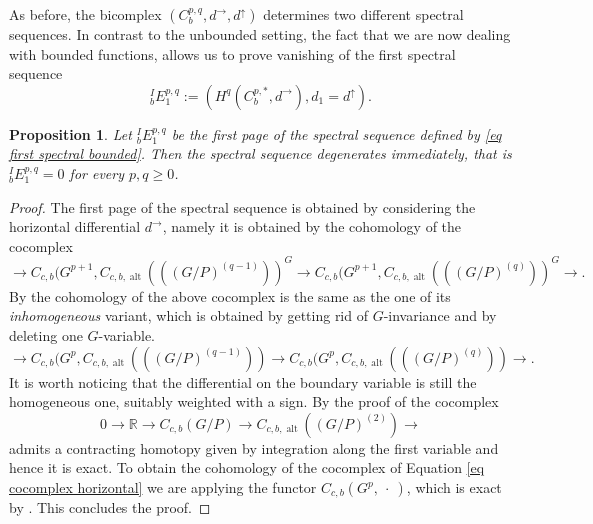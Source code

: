 \documentclass[a4paper]{amsart}
\newtheorem{prop}[lem]{Proposition}
\theoremstyle{definition}
\theoremstyle{remark}
\theoremstyle{TheoremNum}
\DeclareMathOperator{\alt}{\mathrm{alt}}
\begin{document}
As before, the bicomplex $(C_b^{p,q},d^\rightarrow, d^\uparrow)$ determines two different spectral sequences. In contrast to the unbounded setting, the fact that we are now dealing with bounded functions, allows us to prove vanishing of the  first spectral sequence
\begin{equation}\label{eq first spectral bounded}
^I_bE^{p,q}_1:=(H^q(C^{p,\ast}_b,d^{\rightarrow}),d_1=d^\uparrow). 
\end{equation}

\begin{prop}\label{first bounded zero}
Let $^I_bE^{p,q}_1$ be the first page of the spectral sequence defined by \eqref{eq first spectral bounded}. Then the spectral sequence degenerates immediately, that is $^I_bE^{p,q}_1=0$ for every $p,q \geq 0$. 
\end{prop}

\begin{proof}
The first page of the spectral sequence is obtained by considering the horizontal differential $d^\rightarrow$, namely it is obtained by the cohomology of the cocomplex
\begin{equation}\label{eq cocomplex horizontal}
\rightarrow C_{c,b}(G^{p+1},C_{c,b,\alt}(((G/P)^{(q-1)}))^G \rightarrow C_{c,b}(G^{p+1},C_{c,b,\alt}(((G/P)^{(q)}))^G \rightarrow .
\end{equation}
By \cite[Proposition 7.4.12]{Monodbook} the cohomology of the above cocomplex is the same as the one of its \emph{inhomogeneous} variant, which is obtained by getting rid of $G$-invariance and by deleting one $G$-variable. 
\begin{equation}\label{eq inhomogeneous bounded}
\rightarrow C_{c,b}(G^{p},C_{c,b,\alt}(((G/P)^{(q-1)})) \rightarrow C_{c,b}(G^{p},C_{c,b,\alt}(((G/P)^{(q)})) \rightarrow .
\end{equation}
It is worth noticing that the differential on the boundary variable is still the homogeneous one, suitably weighted with a sign. By the proof of \cite[Lemma 7.5.5]{Monodbook} the cocomplex
$$
0 \rightarrow \mathbb{R} \rightarrow  C_{c,b}(G/P) \rightarrow C_{c,b,\alt}((G/P)^{(2)}) \rightarrow
$$
admits a contracting homotopy given by integration along the first variable and hence it is exact. To obtain the cohomology of the cocomplex of Equation \eqref{eq cocomplex horizontal} we are applying the functor $C_{c,b}(G^p, \ \cdot \ )$, which is exact by \cite[Lemma 8.2.4]{Monodbook}. This concludes the proof. 
\end{proof} 
\end{document}
